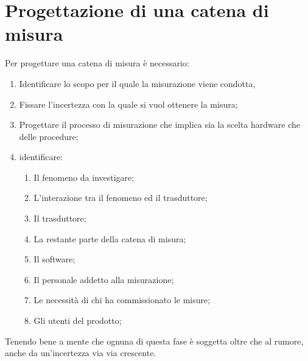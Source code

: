 \documentclass[a4paper, 15pt]{article}
\begin{document}
\newpage
\section{Progettazione di una catena di misura}  
\begin{adjustwidth}{2in}{}

		Per progettare una catena di misura è necessario:
		\begin{enumerate}
			\item Identificare lo scopo per il quale la misurazione viene condotta,
			\item Fissare l'incertezza con la quale si vuol ottenere la misura;
			\item Progettare il processo di misurazione che implica sia la scelta hardware che
			delle procedure;
			\item identificare:
			\begin{enumerate}
				\item Il fenomeno da investigare;
				\item L’interazione tra il fenomeno ed il trasduttore;
				\item Il trasduttore;
				\item La restante parte della catena di misura;
				\item Il software;
				\item Il personale addetto alla misurazione;
				\item Le necessità di chi ha commissionato le misure;
				\item Gli utenti del prodotto;
			\end{enumerate}
		\end{enumerate} 
	Tenendo bene a mente che ognuna di questa fase è soggetta oltre che al rumore, anche da un'incertezza via via crescente.


\end{adjustwidth}
\end{document}
